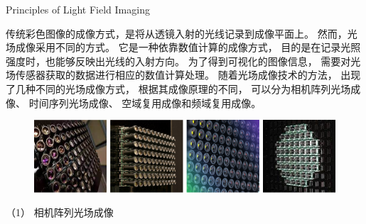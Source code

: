 

{Principles of Light Field Imaging}




传统彩色图像的成像方式，是将从透镜入射的光线记录到成像平面上。
然而，光场成像采用不同的方式。
它是一种依靠数值计算的成像方式，
目的是在记录光照强度时，也能够反映出光线的入射方向。
为了得到可视化的图像信息，
需要对光场传感器获取的数据进行相应的数值计算处理。
随着光场成像技术的方法，
出现了几种不同的光场成像方式，
根据其成像原理的不同，
可以分为相机阵列光场成像、
时间序列光场成像、
空域复用成像和频域复用成像。









\begin{figure}[b]
	\centering
	\includegraphics[width=1\linewidth]{figures/chapter2/camera_array}
	\label{chapter2_fig2:camera_array}
\end{figure}






（1）
相机阵列光场成像


%
%
%


